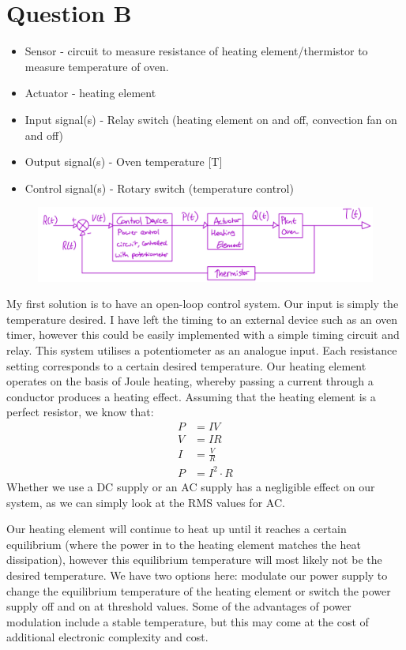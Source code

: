 \documentclass[12pt]{article}
\numberwithin{equation}{section}
\begin{document}
\section{Question B}
\begin{itemize}
  \item Sensor - circuit to measure resistance of heating element/thermistor to measure temperature of oven.
  \item Actuator - heating element
  \item Input signal(s) - Relay switch (heating element on and off, convection fan on and off)
  \item Output signal(s) - Oven temperature [T]
  \item Control signal(s) - Rotary switch (temperature control)
\end{itemize}
\begin{figure}[H]
  \centering
  \includegraphics[width=\textwidth]{./img/2-1blockdiagram.png}
\end{figure}
My first solution is to have an open-loop control system. Our input is simply the temperature desired. I have left the timing to an external device such as an oven timer, however this could be easily implemented with a simple timing circuit and relay. This system utilises a potentiometer as an analogue input. Each resistance setting corresponds to a certain desired temperature. Our heating element operates on the basis of Joule heating, whereby passing a current through a conductor produces a heating effect. Assuming that the heating element is a perfect resistor, we know that:
\begin{align}
  P &= IV\\
  V &= IR\\
  I &= \frac{V}{R}\\
  P &= I^2 \cdot R
\end{align}
Whether we use a DC supply or an AC supply has a negligible effect on our system, as we can simply look at the RMS values for AC. 

Our heating element will continue to heat up until it reaches a certain equilibrium (where the power in to the heating element matches the heat dissipation), however this equilibrium temperature will most likely not be the desired temperature. We have two options here: modulate our power supply to change the equilibrium temperature of the heating element or switch the power supply off and on at threshold values. Some of the advantages of power modulation include a stable temperature, but this may come at the cost of additional electronic complexity and cost. 
\end{document}
